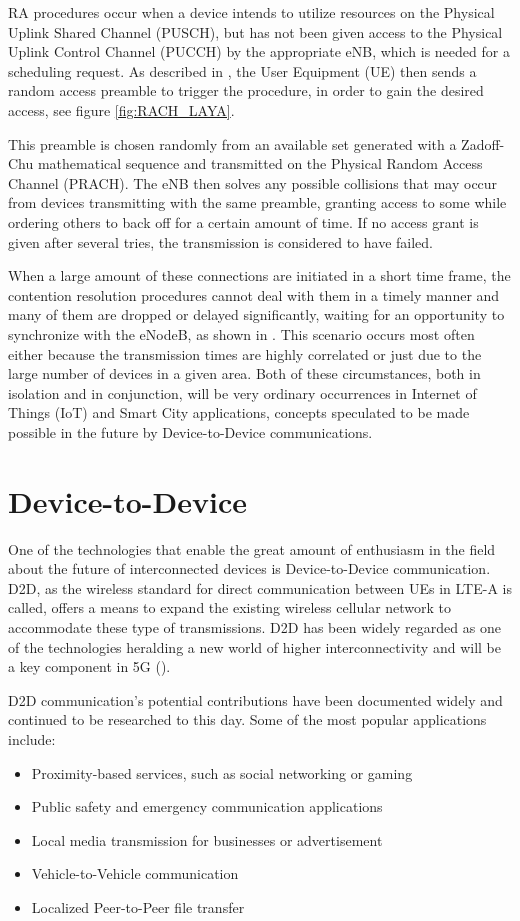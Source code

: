 RA procedures occur when a device intends to utilize resources on the Physical Uplink Shared Channel (PUSCH), but has not been given access to the Physical Uplink Control Channel (PUCCH) by the appropriate eNB, which is needed for a scheduling request. As described in \cite{Cox2012}, the User Equipment (UE) then sends a random access preamble to trigger the procedure, in order to gain the desired access, see figure \ref{fig:RACH_LAYA}.

This preamble is chosen randomly from an available set generated with a Zadoff-Chu mathematical sequence and transmitted on the Physical Random Access Channel (PRACH). The eNB then solves any possible collisions that may occur from devices transmitting with the same preamble, granting access to some while ordering others to back off for a certain amount of time. If no access grant is given after several tries, the transmission is considered to have failed.

When a large amount of these connections are initiated in a short time frame, the contention resolution procedures cannot deal with them in a timely manner and many of them are dropped or delayed significantly, waiting for an opportunity to synchronize with the eNodeB, as shown in \cite{Polese2016}. This scenario occurs most often either because the transmission times are highly correlated or just due to the large number of devices in a given area. Both of these circumstances, both in isolation and in conjunction, will be very ordinary occurrences in Internet of Things (IoT) and Smart City applications, concepts speculated to be made possible in the future by Device-to-Device communications. 

\section{Device-to-Device}\label{B:D2D}
One of the technologies that enable the great amount of enthusiasm in the field about the future of interconnected devices is Device-to-Device communication. D2D, as the wireless standard for direct communication between UEs in LTE-A is called, offers a means to expand the existing wireless cellular network to accommodate these type of transmissions. D2D has been widely regarded as one of the technologies heralding a new world of higher interconnectivity and will be a key component in 5G (\cite{6568922}).

D2D communication's potential contributions have been documented widely and continued to be researched to this day. Some of the most popular applications include:
\begin{itemize}
\item Proximity-based services, such as social networking or gaming
\item Public safety and emergency communication applications
\item Local media transmission for businesses or advertisement
\item Vehicle-to-Vehicle communication
\item Localized Peer-to-Peer file transfer
\end{itemize}

